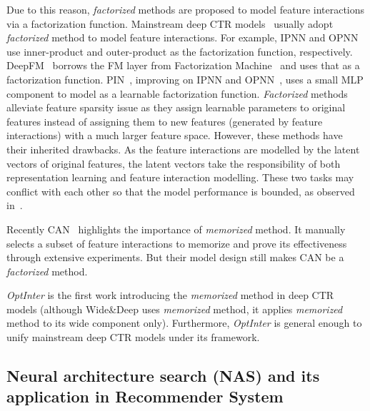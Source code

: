 \documentclass[conference]{IEEEtran}
\begin{document}
{Due to this reason, \emph{factorized} methods are proposed to model feature interactions via a factorization function. Mainstream deep CTR models~\cite{DeepFM,PNN16,PNN19} usually adopt \emph{factorized} method to model feature interactions. For example, IPNN and OPNN~\cite{PNN16} use inner-product and outer-product as the factorization function, respectively. DeepFM~\cite{DeepFM} borrows the FM layer from Factorization Machine~\cite{FM} and uses that as a factorization function. PIN~\cite{PNN19}, improving on IPNN and OPNN~\cite{PNN16}, uses a small MLP component to model as a learnable factorization function. \emph{Factorized} methods alleviate feature sparsity issue as they assign learnable parameters to original features instead of assigning them to new features (generated by feature interactions) with a much larger feature space. However, these methods have their inherited drawbacks. As the feature interactions are modelled by the latent vectors of original features, the latent vectors take the responsibility of both representation learning and feature interaction modelling. These two tasks may conflict with each other so that the model performance is bounded, as observed in~\cite{ElementaryView,CAN}. 
}

Recently CAN~\cite{CAN} highlights the importance of \emph{memorized} method. It manually selects a subset of feature interactions to memorize and prove its effectiveness through extensive experiments. But their model design still makes CAN be a \emph{factorized} method.

\textit{OptInter} is the first work introducing the \emph{memorized} method in deep CTR models (although Wide\&Deep uses \emph{memorized} method, it applies \emph{memorized} method to its wide component only). Furthermore, \textit{OptInter} is general enough to unify mainstream deep CTR models under its framework.










\subsection{Neural architecture search (NAS) and its application in Recommender System}
\end{document}
